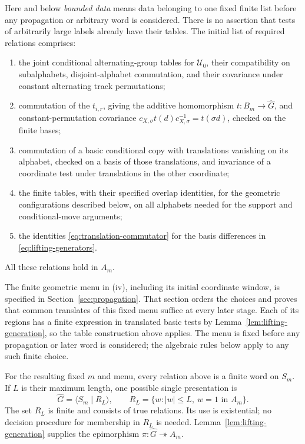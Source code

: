 Here and below \emph{bounded data} means data belonging to one fixed
finite list before any propagation or arbitrary word is considered.
There is no assertion that tests of arbitrarily large labels already
have their tables.  The initial list of required relations comprises:
\begin{enumerate}[label=(\roman*)]
\item the joint conditional alternating-group tables for
      $\mathcal U_0$, their compatibility on subalphabets,
      disjoint-alphabet commutation, and their covariance under
      constant alternating track permutations;
\item commutation of the $t_{i,r}$, giving the additive homomorphism
      $t:B_m\to\widehat G$, and constant-permutation covariance
      $c_{X,\sigma}t(d)c_{X,\sigma}^{-1}=t(\sigma d)$, checked on
      the finite bases;
\item commutation of a basic conditional copy with translations
      vanishing on its alphabet, checked on a basis of those
      translations, and invariance of a coordinate test under
      translations in the other coordinate;
\item the finite tables, with their specified overlap identities,
      for the geometric configurations described below, on all
      alphabets needed for the support and conditional-move arguments;
\item the identities \eqref{eq:translation-commutator} for the basis
      differences in \eqref{eq:lifting-generators}.
\end{enumerate}
All these relations hold in $A_m$.

The finite geometric menu in (iv), including its initial coordinate
window, is specified in Section~\ref{sec:propagation}. That section
orders the choices and proves that common translates of this fixed
menu suffice at every later stage. Each of its regions has a finite
expression in translated basic tests by
Lemma~\ref{lem:lifting-generation}, so the table construction above
applies. The menu is fixed before any propagation or later word is
considered; the algebraic rules below apply to any such finite choice.

For the resulting fixed $m$ and menu, every relation above is a finite
word on $S_m$. If $L$ is their maximum length, one possible single
presentation is
\begin{equation}\label{eq:finite-presented-cover}
 \widehat G=\langle S_m\mid R_L\rangle,
 \qquad
 R_L=\{w:|w|\le L,\ w=1\text{ in }A_m\}.
\end{equation}
The set $R_L$ is finite and consists of true relations.  Its use is
existential; no decision procedure for membership in $R_L$ is needed.
Lemma~\ref{lem:lifting-generation} supplies the epimorphism
$\pi:\widehat G\twoheadrightarrow A_m$.

